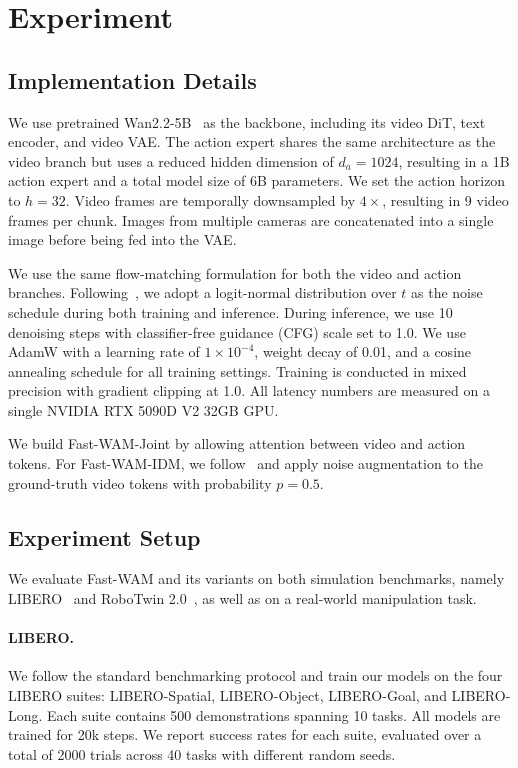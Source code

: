 \documentclass{article}
\begin{document}


\section{Experiment}
\subsection{Implementation Details}
We use pretrained Wan2.2-5B~\cite{wan2025} as the backbone, including its video DiT, text encoder, and video VAE. The action expert shares the same architecture as the video branch but uses a reduced hidden dimension of $d_a=1024$, resulting in a 1B action expert and a total model size of 6B parameters. We set the action horizon to $h=32$. Video frames are temporally downsampled by $4\times$, resulting in 9 video frames per chunk. Images from multiple cameras are concatenated into a single image before being fed into the VAE.

We use the same flow-matching formulation for both the video and action branches. Following~\cite{wan2025}, we adopt a logit-normal distribution over $t$ as the noise schedule during both training and inference. During inference, we use 10 denoising steps with classifier-free guidance (CFG) scale set to 1.0. We use AdamW with a learning rate of $1\times10^{-4}$, weight decay of 0.01, and a cosine annealing schedule for all training settings. Training is conducted in mixed precision with gradient clipping at 1.0. All latency numbers are measured on a single NVIDIA RTX 5090D V2 32GB GPU.

We build Fast-WAM-Joint by allowing attention between video and action tokens. For Fast-WAM-IDM, we follow~\cite{lingbot-va2026} and apply noise augmentation to the ground-truth video tokens with probability $p=0.5$.



\subsection{Experiment Setup}
We evaluate Fast-WAM and its variants on both simulation benchmarks, namely LIBERO~\cite{liu2023libero} and RoboTwin 2.0~\cite{chen2025robotwin}, as well as on a real-world manipulation task.

\paragraph{LIBERO.}
We follow the standard benchmarking protocol and train our models on the four LIBERO suites: LIBERO-Spatial, LIBERO-Object, LIBERO-Goal, and LIBERO-Long. Each suite contains 500 demonstrations spanning 10 tasks. All models are trained for 20k steps. We report success rates for each suite, evaluated over a total of 2000 trials across 40 tasks with different random seeds.
\end{document}
